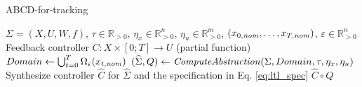

\begin{algorithm}
	\caption{ABCD-for-tracking}
	\label{alg:abcd-with-time-for-tracking}
	\begin{algorithmic}[1]
		\Require $\Sigma=(X,U,W,f)$, $\tau \in \mathbb{R}_{>0}$, $\eta_x\in \mathbb{R}^n_{>0}$, $\eta_u\in \mathbb{R}^m_{>0}$, $(x_{0,\mathit{nom}},\ldots,x_{T,\mathit{nom}})$, $\varepsilon \in \mathbb{R}_{>0}^{n}$
		\Ensure Feedback controller $C\colon X\times[0;T]\to U$ (partial function)
		\State $Domain \gets \bigcup_{t=0}^T\Omega_{\varepsilon}(x_{t,\mathit{nom}})$
		\State $(\widehat{\Sigma},Q) \gets \mathit{ComputeAbstraction}(\Sigma, Domain, \tau, \eta_{x} , \eta_u)$
		\State Synthesize controller $\widehat{C}$ for $\widehat{\Sigma}$ and the specification in Eq. \eqref{eq:ltl_spec} %
		\State \Return $\widehat{C}\circ Q$
	\end{algorithmic}
\end{algorithm}
